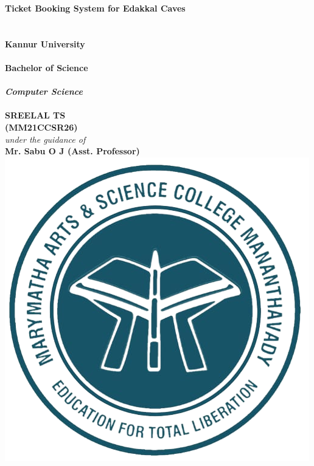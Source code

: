 \documentclass[12pt,a4paper]{report}
\begin{document}


\thispagestyle{empty}

\begin{center}
    \fontsize{25pt}{18pt}\selectfont \textbf{
        Ticket Booking System for Edakkal Caves
    }\\[.5 cm]
    \fontsize{12pt}{18pt}\selectfont {}\\[.5 cm]
    \fontsize{12pt}{18pt}\selectfont {}\\[.7 cm]
    \fontsize{14pt}{18pt}\selectfont \textbf{Kannur
        University}\\[.2 cm]
    \fontsize{12pt}{18pt}\selectfont {}\\[.5 cm]
    \vspace{0.4cm}
    \fontsize{14pt}{18pt}\selectfont \textbf{Bachelor of Science}\\
    \fontsize{12pt}{18pt}\selectfont {}\\
    \fontsize{12pt}{18pt}\selectfont \textbf{\textit{Computer Science}}\\
    \fontsize{12pt}{18pt}\selectfont {}\\
    \vspace{0.4cm}
    \fontsize{17.28pt}{18pt}\selectfont \textbf{SREELAL TS}\\[.2 cm]
    \fontsize{14pt}{18pt}\selectfont \textbf{(MM21CCSR26)}\\[.5 cm]
    \fontsize{12pt}{18pt}\selectfont \textit{under the guidance of}\\[.4 cm]
    \fontsize{14pt}{18pt}\selectfont \textbf{Mr. Sabu O J (Asst. Professor)}\\
    \vspace{.7cm}
    \includegraphics[scale=0.25]{assets/mmc.png}\\[.2 cm]

\end{center}
\end{document}
